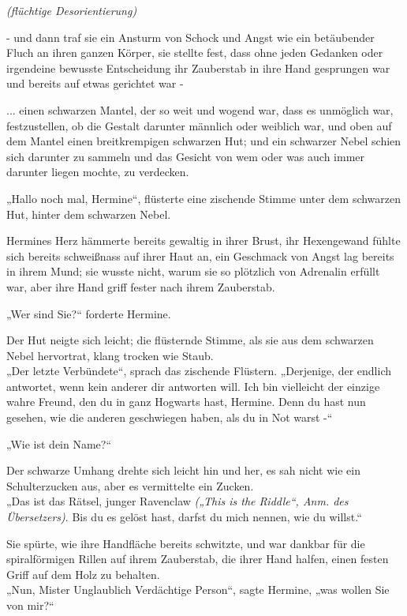 {\emph{(flüchtige Desorientierung)}

- und dann traf sie ein Ansturm von Schock und Angst wie ein betäubender Fluch an ihren ganzen Körper, sie stellte fest, dass ohne jeden Gedanken oder irgendeine bewusste Entscheidung ihr Zauberstab in ihre Hand gesprungen war und bereits auf etwas gerichtet war -

... einen schwarzen Mantel, der so weit und wogend war, dass es unmöglich war, festzustellen, ob die Gestalt darunter männlich oder weiblich war, und oben auf dem Mantel einen breitkrempigen schwarzen Hut; und ein schwarzer Nebel schien sich darunter zu sammeln und das Gesicht von wem oder was auch immer darunter liegen mochte, zu verdecken.

„Hallo noch mal, Hermine“, flüsterte eine zischende Stimme unter dem schwarzen Hut, hinter dem schwarzen Nebel.

Hermines Herz hämmerte bereits gewaltig in ihrer Brust, ihr Hexengewand fühlte sich bereits schweißnass auf ihrer Haut an, ein Geschmack von Angst lag bereits in ihrem Mund; sie wusste nicht, warum sie so plötzlich von Adrenalin erfüllt war, aber ihre Hand griff fester nach ihrem Zauberstab.

„Wer sind Sie?“ forderte Hermine.

Der Hut neigte sich leicht; die flüsternde Stimme, als sie aus dem schwarzen Nebel hervortrat, klang trocken wie Staub.\\ „Der letzte Verbündete“, sprach das zischende Flüstern. „Derjenige, der endlich antwortet, wenn kein anderer dir antworten will. Ich bin vielleicht der einzige wahre Freund, den du in ganz Hogwarts hast, Hermine. Denn du hast nun gesehen, wie die anderen geschwiegen haben, als du in Not warst -“

„Wie ist dein Name?“

Der schwarze Umhang drehte sich leicht hin und her, es sah nicht wie ein Schulterzucken aus, aber es vermittelte ein Zucken.\\ „Das ist das Rätsel, junger Ravenclaw \emph{(„This is the Riddle“, Anm. des Übersetzers)}. Bis du es gelöst hast, darfst du mich nennen, wie du willst.“

Sie spürte, wie ihre Handfläche bereits schwitzte, und war dankbar für die spiralförmigen Rillen auf ihrem Zauberstab, die ihrer Hand halfen, einen festen Griff auf dem Holz zu behalten.\\ „Nun, Mister Unglaublich Verdächtige Person“, sagte Hermine, „was wollen Sie von mir?“

}
